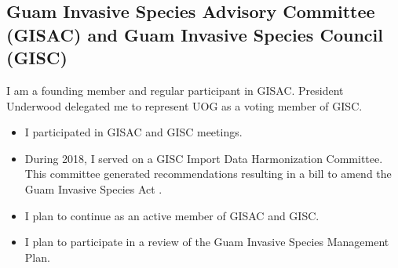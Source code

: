 \subsection{Guam Invasive Species Advisory Committee (GISAC) and Guam Invasive Species Council (GISC)}
\begin{refsection}
	
I am a founding member and regular participant in GISAC. President Underwood delegated me to represent UOG as a voting member of GISC.

\activities

\begin{itemize}
	
\item I participated in GISAC and GISC meetings.

\item During 2018, I served on a GISC Import Data Harmonization Committee.
This committee generated recommendations \cite{guerrero_guam_2018}
resulting in a bill to amend the Guam Invasive Species Act \cite{guerrero_bill_2018}.

\end{itemize}

\plans

\begin{itemize}
	
\item I plan to continue as an active member of GISAC and GISC.

\item I plan to participate in a review of the Guam Invasive Species Management Plan.

\end{itemize}

\printbibliography[heading=none]

\end{refsection}

